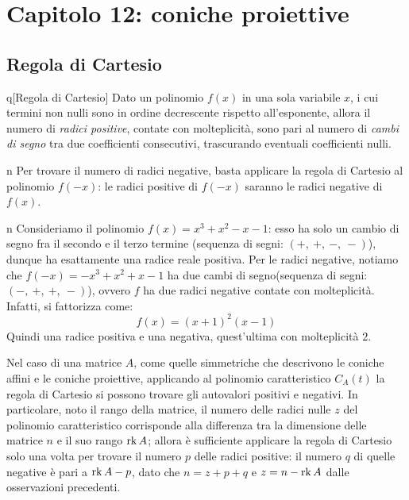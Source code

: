 \section{Capitolo 12: coniche proiettive}
\subsection{Regola di Cartesio}\label{Cartesioquellodeibidonidellacarta}
\begin{theorem}{q}[Regola di Cartesio]
	Dato un polinomio $f(x)$ in una sola variabile $x$, i cui termini non nulli sono in ordine decrescente rispetto all'esponente, allora il numero di \textit{radici positive}, contate con molteplicità, sono pari al numero di \textit{cambi di segno} tra due coefficienti consecutivi, trascurando eventuali coefficienti nulli.
\end{theorem}
\begin{tipsandtricks}{n}
	Per trovare il numero di radici negative, basta applicare la regola di Cartesio al polinomio $f\left(-x\right)$: le radici positive di $f\left(-x\right)$ saranno le radici negative di $f(x)$.
\end{tipsandtricks}
\begin{example}{n}
	Consideriamo il polinomio $f(x)=x^3+x^2-x-1$: esso ha solo un cambio di segno fra il secondo e il terzo termine (sequenza di segni: $\left(+,\ +,\ -,\ -\right)$), dunque ha esattamente una radice reale positiva. Per le radici negative, notiamo che $f\left(-x\right)=-x^3+x^2+x-1$ ha due cambi di segno(sequenza di segni: $\left(-,\ +,\ +,\ -\right)$), ovvero $f$ ha due radici negative contate con molteplicità. Infatti, si fattorizza come:
	\begin{equation*}
		f(x)=\left(x+1\right)^2\left(x-1\right)
	\end{equation*}
	Quindi una radice positiva e una negativa, quest'ultima con molteplicità $2$.
\end{example}
Nel caso di una matrice $A$, come quelle simmetriche che descrivono le coniche affini e le coniche proiettive, applicando al polinomio caratteristico $C_A\left(t\right)$ la regola di Cartesio si possono trovare gli autovalori positivi e negativi.
In particolare, noto il rango della matrice, il numero delle radici nulle $z$ del polinomio caratteristico corrisponde alla differenza tra la dimensione delle matrice $n$ e il suo rango $\operatorname{rk} A$; allora è sufficiente applicare la regola di Cartesio solo una volta per trovare il numero $p$ delle radici positive: il numero $q$ di quelle negative è pari a $\operatorname{rk} A - p$, dato che $n=z+p+q$ e $z=n-\operatorname{rk} A$ dalle osservazioni precedenti.
